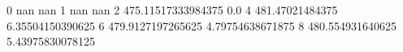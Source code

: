 0 nan nan
1 nan nan
2 475.11517333984375 0.0
4 481.47021484375 6.35504150390625
6 479.9127197265625 4.79754638671875
8 480.554931640625 5.43975830078125

